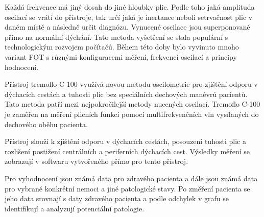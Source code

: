 Každá frekvence má jiný dosah do jiné hloubky plic. Podle toho jaká amplituda oscilací se vrátí do přístroje,  tak určí jaká je inertance neboli setrvačnost plic v daném místě a následně určit diagnózu. \cite{Oostveen}
Vynucené oscilace jsou superponované přímo na normální dýchání. Tato metoda vyšetření se stala populární s technologickým rozvojem počítačů. \cite{Vlcek2018} Během této doby bylo vyvinuto mnoho variant FOT s různými konfiguracemi měření, frekvencí oscilací a principy hodnocení. 

Přístroj tremoflo C-100 využívá novou metodu oscilometrie pro zjištění odporu  v dýchacích cestách a tuhosti plic bez speciálních dechových manévrů pacientů. Tato metoda patří mezi nejpokročilejší metody nucených oscilací. Tremoflo C-100 je zaměřen na měření plicních funkcí pomocí multifrekvenčních vln vysílaných do dechového oběhu pacienta. \cite{Nasinec}

Přístroj slouží k zjištění odporu v dýchacích cestách, posouzení tuhosti plic a rozlišení postižení centrálních a periferních dýchacích cest. Výsledky měření se zobrazují v softwaru vytvořeného přímo pro tento přístroj. \cite{Nasinec}

Pro vyhodnocení jsou známá data pro zdravého pacienta a dále jsou známá data pro vybrané konkrétní nemoci a jiné patologické stavy.  Po změření pacienta se jeho data srovnají s daty zdravého pacienta a podle odchylek v grafu se identifikují a analyzují potenciální patologie. 
